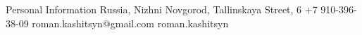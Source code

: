 \begin{rubric}{Personal Information}
  Russia, Nizhni Novgorod, Tallinskaya Street, 6
 \entry*[Phone] +7 910-396-38-09
 \entry*[E-mail] roman.kashitsyn@gmail.com
 \entry*[skype] roman.kashitsyn
\end{rubric}

